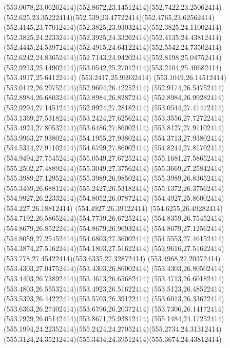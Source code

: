{{	\curveto(553.0078,23.06262414)(552.8672,23.14512414)(552.7422,23.25062414)
	\curveto(552.625,23.35222414)(552.539,23.47722414)(552.4765,23.62562414)
	\curveto(552.4145,23.77012414)(552.3825,23.93032414)(552.3825,24.11002414)
	\curveto(552.3825,24.22332414)(552.3925,24.33262414)(552.4135,24.43812414)
	\curveto(552.4445,24.53972414)(552.4915,24.64122414)(552.5542,24.73502414)
	\curveto(552.6242,24.83652414)(552.7143,24.94202414)(552.8198,25.04752414)
	\curveto(552.9213,25.14902414)(553.0542,25.27012414)(553.2104,25.40682414)
	\lineto(553.4917,25.64122414)
	\lineto(553.2417,25.96932414)
	\curveto(553.1049,26.14512414)(553.0112,26.29752414)(552.9604,26.42252414)
	\curveto(552.9174,26.54752414)(552.8984,26.68032414)(552.8984,26.82872414)
	\curveto(552.8984,26.99282414)(552.9294,27.14512414)(552.9924,27.28182414)
	\curveto(553.0544,27.41472414)(553.1369,27.53182414)(553.2424,27.62562414)
	\curveto(553.3556,27.72722414)(553.4924,27.80532414)(553.6486,27.86002414)
	\curveto(553.8127,27.91102414)(553.9963,27.93802414)(554.1955,27.93802414)
	\curveto(554.3713,27.93802414)(554.5314,27.91102414)(554.6799,27.86002414)
	\curveto(554.8244,27.81702414)(554.9494,27.75452414)(555.0549,27.67252414)
	\curveto(555.1681,27.58652414)(555.2502,27.48892414)(555.3049,27.37562414)
	\curveto(555.3669,27.25842414)(555.3989,27.12952414)(555.3989,26.98502414)
	\curveto(555.3989,26.83652414)(555.3439,26.68812414)(555.2427,26.53182414)
	\curveto(555.1372,26.37562414)(554.9927,26.22332414)(554.8052,26.07872414)
	\lineto(554.4927,25.86002414)
	\lineto(554.227,26.18812414)
	\lineto(554.4927,26.39122414)
	\curveto(554.6255,26.49282414)(554.7192,26.58652414)(554.7739,26.67252414)
	\curveto(554.8359,26.75452414)(554.8679,26.85222414)(554.8679,26.96932414)
	\curveto(554.8679,27.12562414)(554.8059,27.25452414)(554.6803,27.36002414)
	\curveto(554.5553,27.46152414)(554.3874,27.51622414)(554.1803,27.51622414)
	\curveto(553.9616,27.51622414)(553.778,27.45422414)(553.6335,27.32872414)
	\curveto(553.4968,27.20372414)(553.4303,27.04752414)(553.4303,26.86002414)
	\curveto(553.4303,26.80502414)(553.4403,26.73892414)(553.4613,26.65682414)
	\curveto(553.4713,26.60182414)(553.4803,26.55532414)(553.4923,26.51622414)
	\curveto(553.5123,26.48522414)(553.5393,26.44222414)(553.5703,26.39122414)
	\curveto(553.6013,26.33622414)(553.6363,26.27402414)(553.6796,26.20372414)
	\curveto(553.7306,26.14172414)(553.7929,26.05142414)(553.8671,25.93812414)
	\lineto(555.1484,24.17252414)
	\curveto(555.1994,24.22352414)(555.2424,24.27052414)(555.2734,24.31312414)
	\curveto(555.3124,24.35212414)(555.3434,24.39512414)(555.3674,24.43812414)
}}
